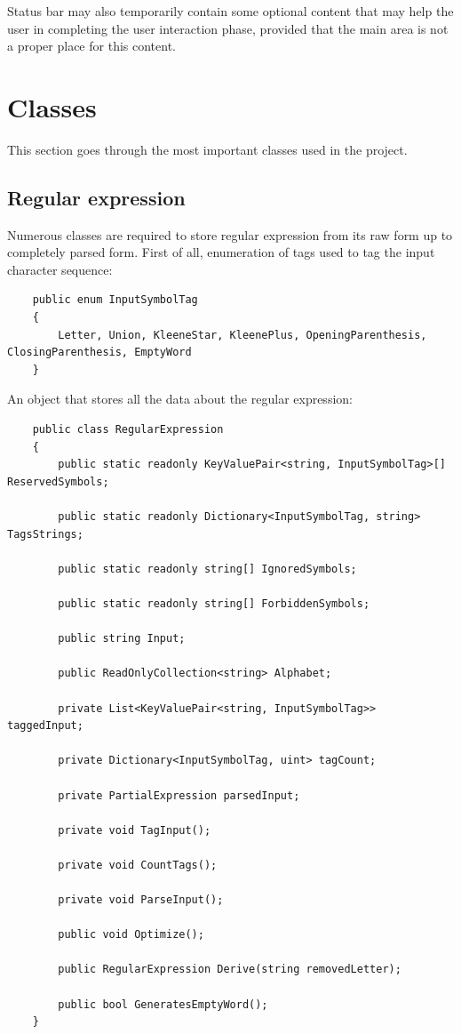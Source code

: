 \documentclass{article}
\begin{document}
Status bar may also temporarily contain some optional content that may help the user in completing
the user interaction phase, provided that the main area is not a proper place for this content.

\section{Classes}
This section goes through the most important classes used in the project.

\subsection{Regular expression}
Numerous classes are required to store regular expression from its raw form up to completely parsed
form. First of all, enumeration of tags used to tag the input character sequence:

\begin{verbatim}
	public enum InputSymbolTag
	{
		Letter, Union, KleeneStar, KleenePlus, OpeningParenthesis, ClosingParenthesis, EmptyWord
	}
\end{verbatim}

An object that stores all the data about the regular expression:

\begin{verbatim}
	public class RegularExpression
	{
		public static readonly KeyValuePair<string, InputSymbolTag>[] ReservedSymbols;

		public static readonly Dictionary<InputSymbolTag, string> TagsStrings;

		public static readonly string[] IgnoredSymbols;

		public static readonly string[] ForbiddenSymbols;

		public string Input;

		public ReadOnlyCollection<string> Alphabet;

		private List<KeyValuePair<string, InputSymbolTag>> taggedInput;

		private Dictionary<InputSymbolTag, uint> tagCount;

		private PartialExpression parsedInput;

		private void TagInput();

		private void CountTags();

		private void ParseInput();

		public void Optimize();

		public RegularExpression Derive(string removedLetter);

		public bool GeneratesEmptyWord();
	}
\end{verbatim}
\end{document}
